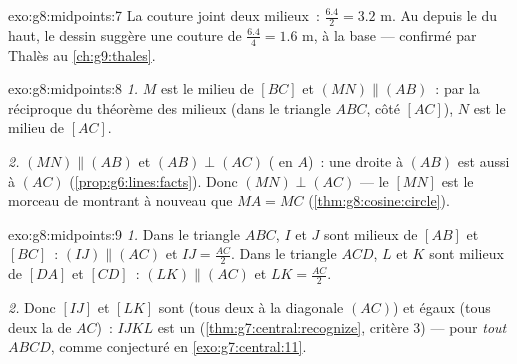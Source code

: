 \begin{solution}{exo:g8:midpoints:7}
La couture joint deux milieux~: $\frac{6.4}{2} = 3.2$ m. Au 
depuis le  du haut, le dessin suggère une couture de
$\frac{6.4}{4} = 1.6$ m,  à la base --- confirmé par Thalès
au \cref{ch:g9:thales}.
\end{solution}

\begin{solution}{exo:g8:midpoints:8}
\emph{1.} $M$ est le milieu de $[BC]$ et $(MN) \parallel (AB)$~: par
la réciproque du théorème des milieux (dans le triangle $ABC$, côté
$[AC]$), $N$ est le milieu de $[AC]$.

\emph{2.} $(MN) \parallel (AB)$ et $(AB) \perp (AC)$ ( en
$A$)~: une droite  à $(AB)$ est aussi  à
$(AC)$ (\cref{prop:g6:lines:facts}). Donc $(MN) \perp (AC)$ --- le
 $[MN]$ est le morceau de  montrant à nouveau que
$MA = MC$ (\cref{thm:g8:cosine:circle}).
\end{solution}

\begin{solution}{exo:g8:midpoints:9}
\emph{1.} Dans le triangle $ABC$, $I$ et $J$ sont milieux de $[AB]$
et $[BC]$~: $(IJ) \parallel (AC)$ et $IJ = \frac{AC}{2}$. Dans le
triangle $ACD$, $L$ et $K$ sont milieux de $[DA]$ et $[CD]$~:
$(LK) \parallel (AC)$ et $LK = \frac{AC}{2}$.

\emph{2.} Donc $[IJ]$ et $[LK]$ sont  (tous deux 
à la diagonale $(AC)$) et égaux (tous deux la  de $AC$)~:
$IJKL$ est un  (\cref{thm:g7:central:recognize},
critère 3) --- pour \emph{tout}  $ABCD$, comme conjecturé
en \cref{exo:g7:central:11}.
\end{solution}

